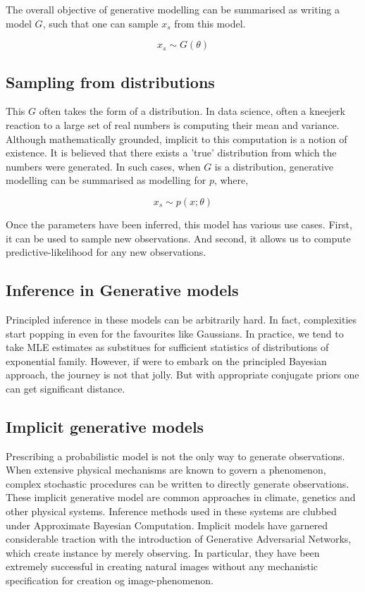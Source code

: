 \documentclass[twoside]{article}
\begin{document}
The overall objective of generative modelling can be summarised as writing a model $G$, such that one can sample $x_s$ from this model.

$$ x_s \sim G(\theta)$$

\subsection{Sampling from distributions}

This $G$ often takes the form of a distribution. In data science, often a kneejerk reaction to a large set of real numbers is computing their mean and variance. Although mathematically grounded, implicit to this computation is a notion of existence. It is believed that there exists a 'true' distribution from which the numbers were generated. In such cases, when $G$ is a distribution, generative modelling can be summarised as modelling for $p$, where,

$$x_s \sim p(x;\theta)$$

Once the parameters have been inferred, this model has various use cases. First, it can be used to sample new observations. And second, it allows us to compute predictive-likelihood for any new observations. 

\subsection{Inference in Generative models}

Principled inference in these models can be arbitrarily hard. In fact, complexities start popping in even for the favourites like Gaussians. In practice, we tend to take MLE estimates as substitues for sufficient statistics of distributions of exponential family. However, if were to embark on the principled Bayesian approach, the journey is not that jolly. But with appropriate conjugate priors one can get significant distance.

\subsection{Implicit generative models}

Prescribing a probabilistic model is not the only way to generate observations. When extensive physical mechanisms are known to govern a phenomenon, complex stochastic procedures can be written to directly generate observations. These implicit generative model are common approaches in climate, genetics and other physical systems. Inference methods used in these systems are clubbed under Approximate Bayesian Computation. Implicit models have garnered considerable traction with the introduction of Generative Adversarial Networks, which create instance by merely observing. In particular, they have been extremely successful in creating natural images without any mechanistic specification for creation og image-phenomenon.
\end{document}

